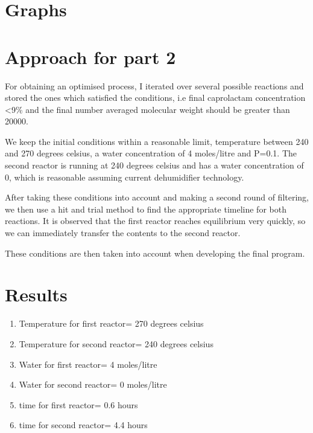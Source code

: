 \section*{Graphs}
     








\section*{Approach for part 2}

For obtaining an optimised process, I iterated over several possible reactions and stored the ones which satisfied the conditions, i.e final caprolactam concentration \textless 9\% and the final number averaged molecular weight should be greater than 20000.

We keep the initial conditions within a reasonable limit, temperature between 240 and 270 degrees celsius, a water concentration of 4 moles/litre and  P=0.1. The second reactor is running at 240 degrees celsius and has a water concentration of 0, which is reasonable assuming current dehumidifier technology.

After taking these conditions into account and making a second round of filtering, we then use a hit and trial method to find the appropriate timeline for both reactions. It is observed that the first reactor reaches equilibrium very quickly, so we can immediately transfer the contents to the second reactor.

These conditions are then taken into account when developing the final program.


\section*{Results}
\begin{enumerate}
\item Temperature for first reactor= 270 degrees celsius
\item Temperature for second reactor= 240 degrees celsius
\item Water for first reactor= 4 moles/litre
\item Water for second reactor= 0 moles/litre
\item time for first reactor= 0.6 hours
\item time for second reactor= 4.4 hours

\end{enumerate} 

    
